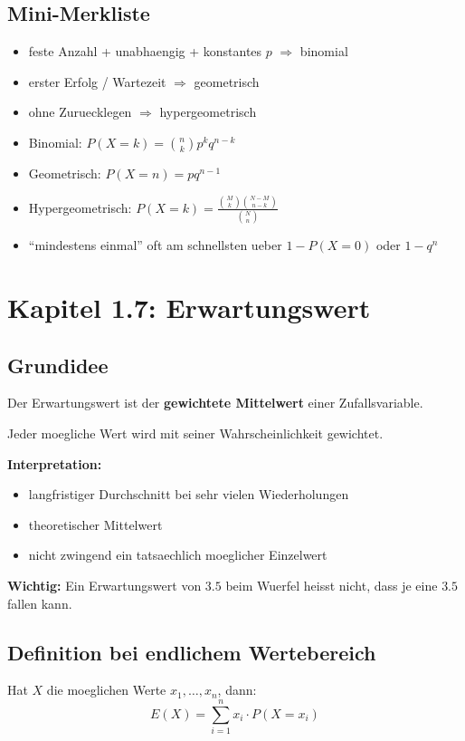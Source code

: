 \documentclass[a4paper,11pt]{article}
\begin{document}
\subsection{Mini-Merkliste}
\begin{itemize}
  \item feste Anzahl + unabhaengig + konstantes $p$ $\Rightarrow$ binomial
  \item erster Erfolg / Wartezeit $\Rightarrow$ geometrisch
  \item ohne Zuruecklegen $\Rightarrow$ hypergeometrisch
  \item Binomial: $\displaystyle P(X=k)=\binom{n}{k}p^k q^{n-k}$
  \item Geometrisch: $\displaystyle P(X=n)=p q^{n-1}$
  \item Hypergeometrisch: $\displaystyle P(X=k)=\frac{\binom{M}{k}\binom{N-M}{n-k}}{\binom{N}{n}}$
  \item ``mindestens einmal'' oft am schnellsten ueber $1-P(X=0)$ oder $1-q^n$
\end{itemize}

\section{Kapitel 1.7: Erwartungswert}

\subsection{Grundidee}
Der Erwartungswert ist der \textbf{gewichtete Mittelwert} einer Zufallsvariable.

Jeder moegliche Wert wird mit seiner Wahrscheinlichkeit gewichtet.

\textbf{Interpretation:}
\begin{itemize}
  \item langfristiger Durchschnitt bei sehr vielen Wiederholungen
  \item theoretischer Mittelwert
  \item nicht zwingend ein tatsaechlich moeglicher Einzelwert
\end{itemize}

\textbf{Wichtig:}
Ein Erwartungswert von $3.5$ beim Wuerfel heisst nicht, dass je eine $3.5$ fallen kann.

\subsection{Definition bei endlichem Wertebereich}
Hat $X$ die moeglichen Werte $x_1,\dots,x_n$, dann:
\[
E(X)=\sum_{i=1}^n x_i \cdot P(X=x_i)
\]
\end{document}
